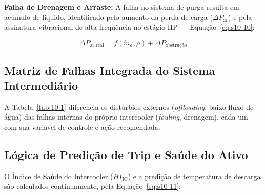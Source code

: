 \documentclass[12pt,a4paper]{article}
\numberwithin{equation}{section}
\numberwithin{table}{section}
\numberwithin{figure}{section}
\begin{document}
	\textbf{Falha de Drenagem e Arraste:} A falha no sistema de purga resulta em acúmulo de líquido, identificado pelo aumento da perda de carga ($\Delta P_{\text{ar}}$) e pela assinatura vibracional de alta frequência no estágio HP — Equação~\eqref{eq:s10-10}:

	\begin{equation}\label{eq:s10-10}
	\Delta P_{\text{ar,real}} = f(\dot{m}_a, \rho) + \Delta P_{\text{obstrução}}
\end{equation}
	
	\subsection{\textbf{Matriz de Falhas Integrada do Sistema Intermediário}}

	A Tabela~\ref{tab:10-1} diferencia os distúrbios externos (\textit{offloading}, baixo fluxo de água) das falhas internas do próprio intercooler (\textit{fouling}, drenagem), cada um com sua variável de controle e ação recomendada.
	\begin{table}[h!tbp]
		\centering
		\renewcommand{\arraystretch}{1.5}
		\caption[Matriz de falhas do intercooler]{Matriz de falhas do intercooler: distúrbios externos versus falhas internas do trocador.}
		\label{tab:10-1}
	\end{table}
	
	\subsection{\textbf{Lógica de Predição de Trip e Saúde do Ativo}}
	O Índice de Saúde do Intercooler ($HI_{\text{IC}}$) e a predição de temperatura de descarga são calculados continuamente, pela Equação~\eqref{eq:s10-11}:
\end{document}
